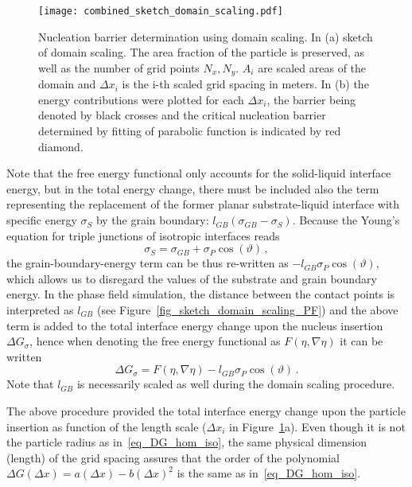 \begin{figure}
	\centering
	\texttt{[image: combined\_sketch\_domain\_scaling.pdf]}
	\caption{Nucleation barrier determination using domain scaling. In (a) sketch of domain scaling. The area fraction of the particle is preserved, as well as the number of grid points $N_x, N_y$. $A_i$ are scaled areas of the domain and $\Delta x_i$ is the i-th scaled grid spacing in meters. In (b) the energy contributions were plotted for each $\Delta x_i$, the barrier being denoted by black crosses and the critical nucleation barrier determined by fitting of parabolic function is indicated by red diamond.}
	\label{fig_domain_scaling}
\end{figure}	

Note that the free energy functional only accounts for the solid-liquid interface energy, but in the total energy change, there must be included also the term representing the replacement of the former planar substrate-liquid interface with specific energy $\sigma_S$ by the grain boundary: $l_{GB}(\sigma_{GB}-\sigma_S)$. Because the Young's equation for triple junctions of isotropic interfaces reads
\begin{equation}\label{eq_young_iso}
	\sigma_S = \sigma_{GB}+\sigma_P\cos(\vartheta) \,,
\end{equation}
the grain-boundary-energy term can be thus re-written as $-l_{GB}\sigma_P\cos(\vartheta)$, which allows us to disregard the values of the substrate and grain boundary energy. In the phase field simulation, the distance between the contact points is interpreted as $l_{GB}$ (see Figure~\ref{fig_sketch_domain_scaling_PF}) and the above term is added to the total interface energy change upon the nucleus insertion $\Delta G_\sigma$, hence when denoting the free energy functional as $F(\eta,\nabla\eta)$ it can be written
\begin{equation}
	\Delta G_\sigma = F(\eta,\nabla\eta) - l_{GB}\sigma_P\cos(\vartheta) \,.
\end{equation}
Note that $l_{GB}$ is necessarily scaled as well during the domain scaling procedure.

The above procedure provided the total interface energy change upon the particle insertion as function of the length scale ($\Delta x_i$ in Figure~\ref{fig_domain_scaling}a). Even though it is not the particle radius as in~\eqref{eq_DG_hom_iso}, the same physical dimension (length) of the grid spacing assures that the order of the polynomial $\Delta G(\Delta x) = a(\Delta x) - b(\Delta x)^2$ is the same as in~\eqref{eq_DG_hom_iso}.


